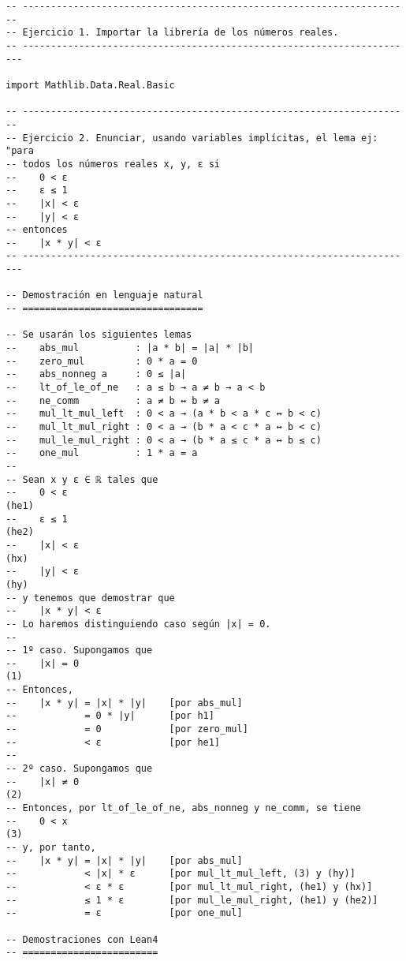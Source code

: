 \begin{verbatim}
-- ---------------------------------------------------------------------
-- Ejercicio 1. Importar la librería de los números reales.
-- ----------------------------------------------------------------------

import Mathlib.Data.Real.Basic

-- ---------------------------------------------------------------------
-- Ejercicio 2. Enunciar, usando variables implícitas, el lema ej: "para
-- todos los números reales x, y, ε si
--    0 < ε
--    ε ≤ 1
--    |x| < ε
--    |y| < ε
-- entonces
--    |x * y| < ε
-- ----------------------------------------------------------------------

-- Demostración en lenguaje natural
-- ================================

-- Se usarán los siguientes lemas
--    abs_mul          : |a * b| = |a| * |b|
--    zero_mul         : 0 * a = 0
--    abs_nonneg a     : 0 ≤ |a|
--    lt_of_le_of_ne   : a ≤ b → a ≠ b → a < b
--    ne_comm          : a ≠ b ↔ b ≠ a
--    mul_lt_mul_left  : 0 < a → (a * b < a * c ↔ b < c)
--    mul_lt_mul_right : 0 < a → (b * a < c * a ↔ b < c)
--    mul_le_mul_right : 0 < a → (b * a ≤ c * a ↔ b ≤ c)
--    one_mul          : 1 * a = a
--
-- Sean x y ε ∈ ℝ tales que
--    0 < ε                                                         (he1)
--    ε ≤ 1                                                         (he2)
--    |x| < ε                                                       (hx)
--    |y| < ε                                                       (hy)
-- y tenemos que demostrar que
--    |x * y| < ε
-- Lo haremos distinguiendo caso según |x| = 0.
--
-- 1º caso. Supongamos que
--    |x| = 0                                                        (1)
-- Entonces,
--    |x * y| = |x| * |y|    [por abs_mul]
--            = 0 * |y|      [por h1]
--            = 0            [por zero_mul]
--            < ε            [por he1]
--
-- 2º caso. Supongamos que
--    |x| ≠ 0                                                        (2)
-- Entonces, por lt_of_le_of_ne, abs_nonneg y ne_comm, se tiene
--    0 < x                                                          (3)
-- y, por tanto,
--    |x * y| = |x| * |y|    [por abs_mul]
--            < |x| * ε      [por mul_lt_mul_left, (3) y (hy)]
--            < ε * ε        [por mul_lt_mul_right, (he1) y (hx)]
--            ≤ 1 * ε        [por mul_le_mul_right, (he1) y (he2)]
--            = ε            [por one_mul]

-- Demostraciones con Lean4
-- ========================


\end{verbatim}
